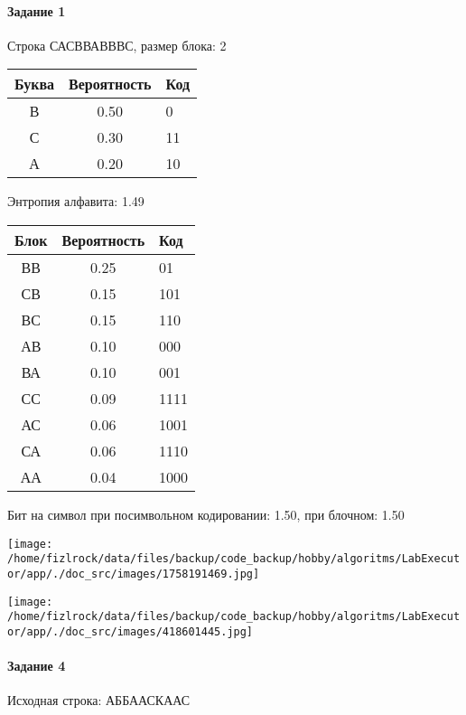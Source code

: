 \documentclass[a4paper, 12pt]{article}
\begin{document}
\paragraph{Задание 1}

Строка САСВВАВВВС, размер блока: 2
\begin{center}
 \begin{tabular}{ |c|c|l| } 
  \hline
     Буква & Вероятность & Код\\ \hline
В & 0.50 & 0\\\hline
С & 0.30 & 11\\\hline
А & 0.20 & 10
\\ \hline \end{tabular}
\end{center}
Энтропия алфавита: 1.49
\begin{center}
 \begin{tabular}{ |c|c|l| } 
  \hline
     Блок & Вероятность & Код\\ \hline
ВВ & 0.25 & 01\\\hline
СВ & 0.15 & 101\\\hline
ВС & 0.15 & 110\\\hline
АВ & 0.10 & 000\\\hline
ВА & 0.10 & 001\\\hline
СС & 0.09 & 1111\\\hline
АС & 0.06 & 1001\\\hline
СА & 0.06 & 1110\\\hline
АА & 0.04 & 1000
\\ \hline \end{tabular}
\end{center}
Бит на символ при посимвольном кодировании: 1.50, при блочном: 1.50

\texttt{[image: /home/fizlrock/data/files/backup/code\_backup/hobby/algoritms/LabExecutor/app/./doc\_src/images/1758191469.jpg]}

\texttt{[image: /home/fizlrock/data/files/backup/code\_backup/hobby/algoritms/LabExecutor/app/./doc\_src/images/418601445.jpg]}
\paragraph{Задание 4}


Исходная строка: АББААСКААС
\end{document}
